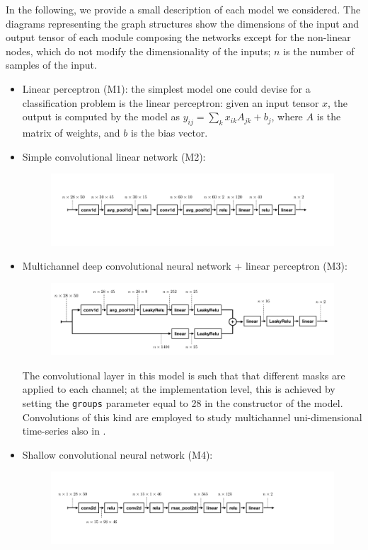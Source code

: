 \documentclass{article}
\begin{document}
In the following, we provide a small description of each model we considered. The diagrams representing the graph structures show the dimensions of the input and output tensor of each module composing the networks except for the non-linear nodes, which do not modify the dimensionality of the inputs; $n$ is the number of samples of the input.
\begin{itemize}
\item Linear perceptron (M1): the simplest model one could devise for a classification problem is the linear perceptron:  given an input tensor $x$, the output is computed by the model as $y_{ij} = \sum_{k}x_{ik} A_{jk} + b_{j}$, where $A$ is the matrix of weights, and $b$ is the bias vector.
\item Simple convolutional linear network (M2):
\begin{figure}[h]
\centering
\includegraphics[width=\textwidth, clip=true,trim=100 300 295 230]{fig/conv1.pdf}
\end{figure}

\item Multichannel deep convolutional neural network + linear perceptron (M3):
\begin{figure}[h!]
\centering
\includegraphics[width=\textwidth, clip=true,trim=30 40 70 50]{fig/conv2.pdf}
\end{figure}

The convolutional layer in this model is such that that different masks are applied to each channel; at the implementation level, this is achieved by setting the \verb|groups| parameter equal to 28 in the constructor of the model. Convolutions of this kind are employed to study multichannel uni-dimensional time-series also in \cite{zheng2014time}.
\item Shallow convolutional neural network (M4):
\begin{figure}[h!]
\centering
\includegraphics[width=\textwidth, clip=true,trim=80 200 520 200]{fig/conv3.pdf}
\end{figure}


\end{itemize}
\end{document}
